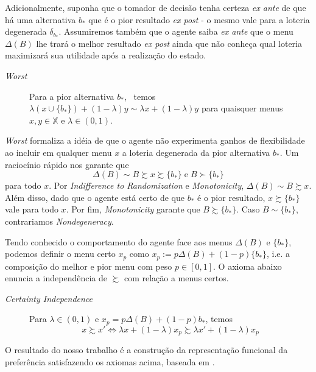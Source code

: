 \documentclass[11pt, a4paper]{article}
\theoremstyle{nonumberplain}
\theoremstyle{plain}
\theoremstyle{plain}
\theoremstyle{plain}
\begin{document}
Adicionalmente, suponha que o tomador de decisão tenha certeza \textit{ex ante} de que há uma alternativa $b_*$ que é o pior resultado \textit{ex post} - o mesmo vale para a loteria degenerada $\delta_{b_*}$. Assumiremos também que o agente saiba \textit{ex ante} que o menu $\Delta(B)$ lhe trará o melhor resultado \textit{ex post} ainda que não conheça qual loteria maximizará sua utilidade após a realização do estado.   

\begin{description}
\item[\textit{Worst}] Para a pior alternativa $b_*$, ~temos $\lambda\left(x\cup \{b_*\}\right)+(1-\lambda)y\sim \lambda x + (1-\lambda)y$ para quaisquer menus $x,y\in \mathbb{X}$ e $\lambda\in (0,1)$. 
\end{description}

\textit{Worst} formaliza a idéia de que o agente não experimenta ganhos de flexibilidade ao incluir  em qualquer menu $x$ a loteria degenerada da pior alternativa $b_*$. Um raciocínio rápido nos garante que $$\Delta(B)\sim B\succsim x\succsim \{b_*\} \; \text{e} \; B\succ \{b_*\}$$ para todo $x$. Por \textit{Indifference to Randomization} e \textit{Monotonicity}, $\Delta(B)\sim B \succsim x$. Além disso, dado que o agente está certo de que $b_*$ é o pior resultado, $x\succsim \{b_*\}$ vale para todo $x$. Por fim, \textit{Monotonicity} garante que $B\succsim \{b_*\}$. Caso $B \sim \{b_*\}$, contrariamos \textit{Nondegeneracy}. 

Tendo conhecido o comportamento do agente face aos menus $\Delta(B)$ e $\{b_*\}$, podemos definir o menu certo $x_p$ como $x_p:=p\Delta(B)+(1-p)\{b_*\}$, i.e. a composição do melhor e pior menu com peso $p\in [0,1]$. O axioma abaixo enuncia a independência de $\succsim$ com relação a menus certos.

\begin{description}
\item [\textit{Certainty Independence}] Para $\lambda\in (0,1)$ e $x_p=p\Delta(B)+(1-p)b_*$, temos $$x\succsim x' \Leftrightarrow \lambda x +(1-\lambda)x_p\succsim \lambda x' + (1-\lambda)x_p$$ 

\end{description}

O resultado do nosso trabalho é a construção da representação funcional da preferência satisfazendo os axiomas acima, baseada em \cite{Epstein2007}.
\end{document}
